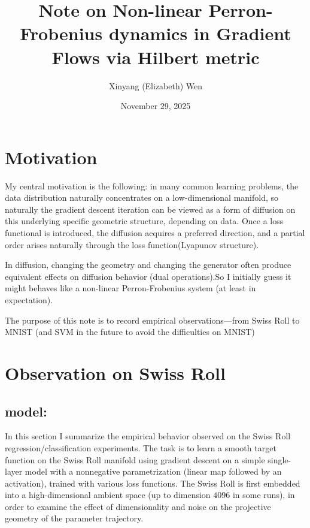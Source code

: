 \documentclass[11pt]{article}
\title{\textbf{Note on Non-linear Perron-Frobenius dynamics in Gradient Flows via Hilbert metric}}
\author{Xinyang (Elizabeth) Wen}
\date{November 29, 2025}
\begin{document}
\maketitle


\section{Motivation}

My central motivation is the following:
in many common learning problems, the data distribution naturally
concentrates on a low-dimensional manifold,
so naturally the gradient descent iteration can be viewed as a form of
diffusion on this underlying specific geometric structure, depending on data. Once a loss
functional is introduced, the diffusion acquires a preferred direction,
and a partial order arises naturally through the loss function(Lyapunov structure).

In diffusion, changing the geometry and changing the generator often produce equivalent effects on diffusion behavior (dual operations).So I initially guess it might
behaves like a non-linear Perron-Frobenius
system (at least in expectation).

The purpose of this note is to record empirical observations—from Swiss Roll to MNIST
(and SVM in the future to avoid the difficulties on MNIST)

\section{Observation on Swiss Roll}
\subsection{model:}
In this section I summarize the empirical behavior observed on the
Swiss Roll regression/classification experiments.  The task is to learn
a smooth target function on the Swiss Roll manifold using gradient
descent on a simple single-layer model with a nonnegative
parametrization (linear map followed by an activation), trained with
various loss functions.  The Swiss Roll is first embedded into a
high-dimensional ambient space (up to dimension $4096$ in some runs), in
order to examine the effect of dimensionality and noise on the projective
geometry of the parameter trajectory.
\end{document}
